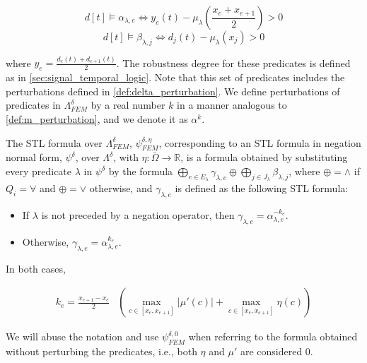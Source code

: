 \documentclass[oribibl]{llncs/llncs}
\newcommand*{\R}{\mathbb{R}}
\begin{document}
\begin{equation}
    d[t] \models \alpha_{\lambda, e} \iff y_e(t) - 
    \mu_\lambda(\frac{x_e + x_{e + 1}}{2}) > 0 
\end{equation}
\begin{equation}
     d[t] \models \beta_{\lambda, j} \iff d_j(t) - \mu_\lambda(x_j) > 0
\end{equation}

where $y_e = \frac{d_e(t) + d_{e+1}(t)}{2}$. The robustness degree for these
predicates is defined as in \cref{sec:signal_temporal_logic}.
Note that this set of predicates includes the perturbations defined in
\cref{def:delta_perturbation}. We define perturbations of predicates in
$\Lambda^{\delta}_{FEM}$ by a real number $k$ in a manner analogous to
\cref{def:m_perturbation}, and we denote it as $\alpha^k$.

\begin{definition} 
\label{def:eta_approximation}
    The STL formula over $\Lambda^{\delta}_{FEM}$, $\psi^{\delta, \eta}_{FEM}$, corresponding to an STL
    formula in negation normal form, $\psi^\delta$, over $\Lambda^\delta$, with
    $\eta : \bar\Omega \to \R$, is a formula obtained by substituting every
    predicate $\lambda$ in $\psi^\delta$ by the formula $\bigoplus_{e \in
    E_\lambda} \gamma_{\lambda,e} \oplus \bigoplus_{j \in J_\lambda} \beta_{\lambda, j}$, 
    where $\oplus = \wedge$ if $Q_i = \forall$ and $\oplus = \vee$
    otherwise, and $\gamma_{\lambda,e}$ is defined as the following STL formula:

    \begin{itemize}
        \item If $\lambda$ is not preceded by a negation operator, then
            $\gamma_{\lambda, e} = \alpha_{\lambda, e}^{-k_e}$.
        \item Otherwise, $\gamma_{\lambda, e} = \alpha_{\lambda, e}^{k_e}$.
    \end{itemize}

    In both cases, 

    \begin{equation}
    \begin{aligned}
        k_e = \frac{x_{e+1} - x_e}{2} & \left (\max_{c \in [x_e, x_{e+1}]}
        |\mu'(c)| + \max_{c \in [x_e, x_{e+1}]} \eta(c) \right )
    \end{aligned}
    \end{equation}

    We will abuse the notation and use $\psi^{\delta, 0}_{FEM}$ when referring
    to the formula obtained without perturbing the predicates, i.e., both $\eta$
    and $\mu'$ are considered 0.
\end{definition}
\end{document}
